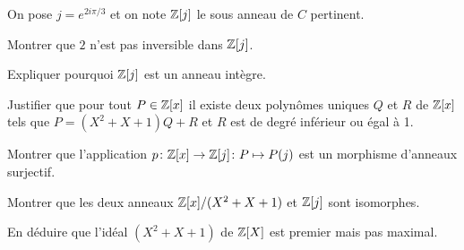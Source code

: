 \documentclass[french]{report}
\begin{document}
\begin{exo}
    On pose \(j=e^{2i\pi/3}\) et on note \(\mathbb{Z}[j]\) le sous anneau de \(C\) pertinent.
    \begin{q}{1}
        Montrer que \(2\) n'est pas inversible dans \(\mathbb{Z}[j]\).
    \end{q}
    \begin{q}{2}
        Expliquer pourquoi \(\mathbb{Z}[j]\) est un anneau intègre.
    \end{q}
    \begin{q}{3}
        Justifier que pour tout \(P\in\mathbb{Z}[x]\) il existe deux polynômes uniques \(Q\) et \(R\)
        de \(\mathbb{Z}[x]\) tels que \(P=(X^2+X+1)Q+R\) et \(R\) est de degré inférieur ou égal à 1.
    \end{q}
    \begin{q}{4}
        Montrer que l'application \(p\colon\mathbb{Z}[x]\to\mathbb{Z}[j]\colon P\mapsto P(j)\) est un
        morphisme d'anneaux surjectif.
    \end{q}
    \begin{q}{5}
        Montrer que les deux anneaux \(\mathbb{Z}[x]/(X^2+X+1)\) et \(\mathbb{Z}[j]\) sont isomorphes.
    \end{q}
    \begin{q}{6}
        En déduire que l'idéal \((X^2+X+1)\) de \(\mathbb{Z}[X]\) est premier mais pas maximal.
    \end{q}
\end{exo}
\clearpage
\end{document}
